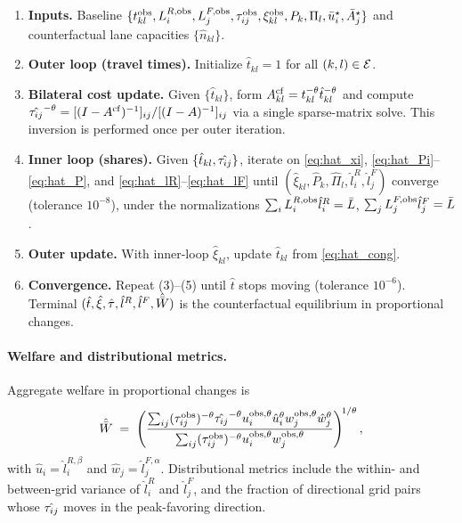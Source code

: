 \begin{enumerate}[leftmargin=2em,itemsep=0.25em]
\item \textbf{Inputs.} Baseline
      $\{t_{kl}^{\mathrm{obs}},L_i^{R,\mathrm{obs}},L_j^{F,\mathrm{obs}},\tau_{ij}^{\mathrm{obs}},\xi_{kl}^{\mathrm{obs}},
      P_k,\Pi_l,\bar u_i^{\star},\bar A_j^{\star}\}$ and counterfactual
      lane capacities $\{\hat n_{kl}\}$.
\item \textbf{Outer loop (travel times).} Initialize
      $\hat t_{kl}=1$ for all $(k,l)\in\mathcal E$.
\item \textbf{Bilateral cost update.} Given $\{\hat t_{kl}\}$, form
      $A^{\mathrm{cf}}_{kl}=t_{kl}^{-\theta}\hat t_{kl}^{-\theta}$ and compute
      $\hat{\tau_{ij}}^{-\theta}=[(I-A^{\mathrm{cf}})^{-1}]_{ij}/[(I-A)^{-1}]_{ij}$
      via a single sparse-matrix solve.  This inversion is performed
      once per outer iteration.
\item \textbf{Inner loop (shares).} Given $\{\hat t_{kl},\hat{\tau_{ij}}\}$,
      iterate on \eqref{eq:hat_xi}, \eqref{eq:hat_Pi}--\eqref{eq:hat_P},
      and \eqref{eq:hat_lR}--\eqref{eq:hat_lF} until
      $(\hat\xi_{kl},\hat P_k,\hat\Pi_l,\hat l_i^R,\hat l_j^F)$
      converge (tolerance $10^{-8}$), under the normalizations
      $\sum_i L_i^{R,\mathrm{obs}}\hat l_i^R=\bar L$,
      $\sum_j L_j^{F,\mathrm{obs}}\hat l_j^F=\bar L$.
\item \textbf{Outer update.} With inner-loop $\hat\xi_{kl}$, update
      $\hat t_{kl}$ from \eqref{eq:hat_cong}.
\item \textbf{Convergence.} Repeat (3)--(5) until $\hat t$ stops moving
      (tolerance $10^{-6}$).  Terminal
      $(\hat t,\hat\xi,\hat\tau,\hat l^R,\hat l^F,\hat{\bar W})$ is the
      counterfactual equilibrium in proportional changes.
\end{enumerate}

\paragraph{Welfare and distributional metrics.}
Aggregate welfare in proportional changes is
\begin{equation}\label{eq:What}
  \hat{\bar W}
  \;=\;\left(\frac{\sum_{ij}(\tau_{ij}^{\mathrm{obs}})^{-\theta}\hat{\tau_{ij}}^{-\theta}
                   u_i^{\mathrm{obs},\theta}\hat u_i^{\theta}
                   w_j^{\mathrm{obs},\theta}\hat w_j^{\theta}}
                  {\sum_{ij}(\tau_{ij}^{\mathrm{obs}})^{-\theta}
                   u_i^{\mathrm{obs},\theta}w_j^{\mathrm{obs},\theta}}\right)^{\!1/\theta},
\end{equation}
with $\hat u_i=\hat l_i^{R,\beta}$ and $\hat w_j=\hat l_j^{F,\alpha}$.
Distributional metrics include the within- and between-grid variance
of $\hat l_i^R$ and $\hat l_j^F$, and the fraction of
directional grid pairs whose $\hat{\tau_{ij}}$ moves in the peak-favoring
direction.

